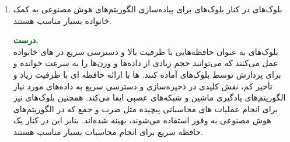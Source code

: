\begin{enumerate}
	
	\item 
	بلوک‌های  در کنار بلوک‌های  برای پیاده‌سازی الگوریتم‌های هوش مصنوعی به کمک  خانواده  بسیار مناسب هستند.
	\begin{qsolve}
		\textbf{\textcolor{darkgreen}{درست.}}\\
		بلوک‌های  به عنوان حافظه‌هایی با ظرفیت بالا و دسترسی سریع در  های خانواده  عمل می‌کنند که می‌توانند حجم زیادی از داده‌ها و وزن‌ها را به سرعت خوانده و برای پردازش توسط بلوک‌های  آماده کنند.  ها با ارائه حافظه ای با ظرفیت زیاد و تأخیر کم، نقش کلیدی در ذخیره‌سازی و دسترسی سریع به داده‌های مورد نیاز الگوریتم‌های یادگیری ماشین و شبکه‌های عصبی ایفا می‌کند. همچنین بلوک‌های  نیز برای انجام عملیات های محاسباتی پیچیده مثل ضرب و جمع که در الگوریتم‌های هوش مصنوعی به وفور استفاده می‌شوند، بهینه شده‌اند. بنابر این در کنار یک حافظه سریع برای انجام محاسبات بسیار مناسب هستند.
	\end{qsolve}
	
	
\end{enumerate}